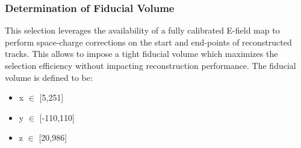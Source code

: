 \subsubsection{Determination of Fiducial Volume}
\label{sssec:NuMUCCsel:constr:FV}

\par This selection leverages the availability of a fully calibrated E-field map to perform space-charge corrections on the start and end-points of reconstructed tracks. This allows to impose a tight fiducial volume which maximizes the selection efficiency without impacting reconstruction performance. The fiducial volume is defined to be: 

\begin{itemize}
    \item x $\in$ [5,251]
    \item y $\in$ [-110,110]
    \item z $\in$ [20,986]
\end{itemize}

